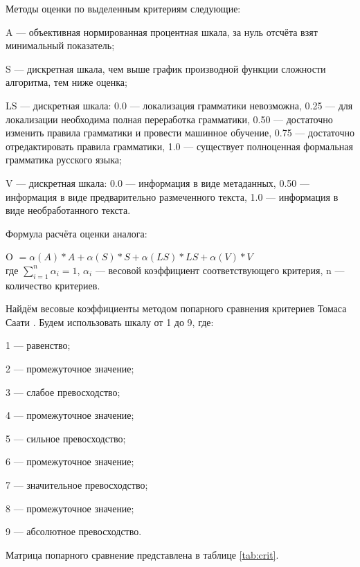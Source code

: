 Методы оценки по выделенным критериям следующие:
\begin{list}{}{\leftmargin=1.5cm}
	\item A --- объективная нормированная процентная шкала, за нуль отсчёта взят минимальный показатель;
	\item S --- дискретная шкала, чем выше график производной функции сложности алгоритма, тем ниже оценка;
	\item LS --- дискретная шкала: 0.0 --- локализация грамматики невозможна, 0.25 --- для локализации необходима полная переработка грамматики, 0.50 --- достаточно изменить правила грамматики и провести машинное обучение, 0.75 --- достаточно отредактировать правила грамматики, 1.0 --- существует полноценная формальная грамматика русского языка;
	\item V --- дискретная шкала: 0.0 --- информация в виде метаданных, 0.50 --- информация в виде предварительно размеченного текста, 1.0 --- информация в виде необработанного текста.
\end{list}

Формула расчёта оценки аналога:

O \(= \alpha(A)*A + \alpha(S)*S + \alpha(LS)*LS + \alpha(V)*V\)\\
где 
\(\sum_{i=1}^{n} \alpha_i = 1\), \(\alpha_i\) --- весовой коэффициент соответствующего критерия, n --- количество критериев.

Найдём весовые коэффициенты методом попарного сравнения критериев Томаса Саати \cite{tsaati}. 
Будем использовать шкалу от 1 до 9, где: 
\begin{list}{}{\leftmargin=1.5cm}
  \item 1 --- равенство;
  \item 2 --- промежуточное значение;
  \item 3 --- слабое превосходство;
  \item 4 --- промежуточное значение;
  \item 5 --- сильное превосходство;
  \item 6 --- промежуточное значение;
  \item 7 --- значительное превосходство;
  \item 8 --- промежуточное значение;
  \item 9 --- абсолютное превосходство.
\end{list}
Матрица попарного сравнение представлена в таблице \ref{tab:crit}.

